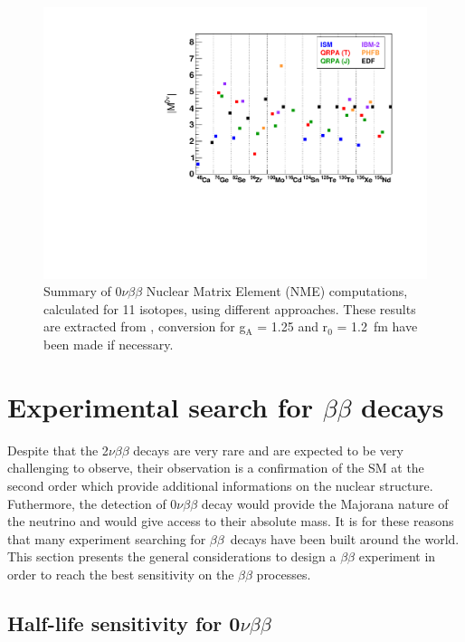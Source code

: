 \documentclass[main.tex]{subfiles}
\begin{document}
\begin{figure}[h!]
\begin{center}
\includegraphics[scale=0.70]{pictures/Chap2/NMEvalue.pdf}
\caption{Summary of 0$\nu\beta\beta$ Nuclear Matrix Element (NME) computations, calculated for 11 isotopes, using different approaches. These results are extracted from \cite{TheoryOfNeutrinolessDBD}, conversion for g$_{\text{A}}$ = 1.25 and r$_{\text{0}}$  = 1.2~fm have been made if necessary.}
\label{NME}
\end{center}
\end{figure}


\FloatBarrier

\section{Experimental search for $\beta\beta$ decays}


\NI Despite that the 2$\nu\beta\beta$ decays are very rare and are expected to be very challenging to observe, their observation is a confirmation of the SM at the second order which provide additional informations on the nuclear structure. Futhermore, the detection of 0$\nu\beta\beta$ decay would provide the Majorana nature of the neutrino and would give access to their absolute mass. It is for these reasons that many experiment searching for $\beta\beta$~decays have been built around the world. This section presents the general considerations to design a $\beta\beta$ experiment in order to reach the best sensitivity on the $\beta\beta$ processes.


\subsection{Half-life sensitivity for 0$\nu\beta\beta$}
\end{document}
